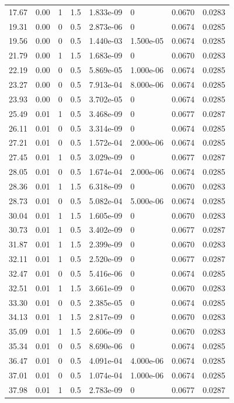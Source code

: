 \documentclass[preview]{standalone}
\begin{document}
{{\begin{tabular}{L{1.2cm}C{1.2cm} C{0.3cm}C{0.5cm} C{1.4cm}C{1.4cm} C{1.4cm}C{1.4cm}}
  17.67  &  0.00  & 1     & 1.5 &  1.833e-09  & 0  & 0.0670 &  0.0283   \\ 
  19.31  &  0.00  & 0     & 0.5 &  2.873e-06  & 0  & 0.0674 &  0.0285   \\ 
  19.56  &  0.00  & 0     & 0.5 &  1.440e-03  & 1.500e-05  & 0.0674 &  0.0285   \\ 
  21.79  &  0.00  & 1     & 1.5 &  1.683e-09  & 0  & 0.0670 &  0.0283   \\ 
  22.19  &  0.00  & 0     & 0.5 &  5.869e-05  & 1.000e-06  & 0.0674 &  0.0285   \\ 
  23.27  &  0.00  & 0     & 0.5 &  7.913e-04  & 8.000e-06  & 0.0674 &  0.0285   \\ 
  23.93  &  0.00  & 0     & 0.5 &  3.702e-05  & 0  & 0.0674 &  0.0285   \\ 
  25.49  &  0.01  & 1     & 0.5 &  3.468e-09  & 0  & 0.0677 &  0.0287   \\ 
  26.11  &  0.01  & 0     & 0.5 &  3.314e-09  & 0  & 0.0674 &  0.0285   \\ 
  27.21  &  0.01  & 0     & 0.5 &  1.572e-04  & 2.000e-06  & 0.0674 &  0.0285   \\ 
  27.45  &  0.01  & 1     & 0.5 &  3.029e-09  & 0  & 0.0677 &  0.0287   \\ 
  28.05  &  0.01  & 0     & 0.5 &  1.674e-04  & 2.000e-06  & 0.0674 &  0.0285   \\ 
  28.36  &  0.01  & 1     & 1.5 &  6.318e-09  & 0  & 0.0670 &  0.0283   \\ 
  28.73  &  0.01  & 0     & 0.5 &  5.082e-04  & 5.000e-06  & 0.0674 &  0.0285   \\ 
  30.04  &  0.01  & 1     & 1.5 &  1.605e-09  & 0  & 0.0670 &  0.0283   \\ 
  30.73  &  0.01  & 1     & 0.5 &  3.402e-09  & 0  & 0.0677 &  0.0287   \\ 
  31.87  &  0.01  & 1     & 1.5 &  2.399e-09  & 0  & 0.0670 &  0.0283   \\ 
  32.11  &  0.01  & 1     & 0.5 &  2.520e-09  & 0  & 0.0677 &  0.0287   \\ 
  32.47  &  0.01  & 0     & 0.5 &  5.416e-06  & 0  & 0.0674 &  0.0285   \\ 
  32.51  &  0.01  & 1     & 1.5 &  3.661e-09  & 0  & 0.0670 &  0.0283   \\ 
  33.30  &  0.01  & 0     & 0.5 &  2.385e-05  & 0  & 0.0674 &  0.0285   \\ 
  34.13  &  0.01  & 1     & 1.5 &  2.817e-09  & 0  & 0.0670 &  0.0283   \\ 
  35.09  &  0.01  & 1     & 1.5 &  2.606e-09  & 0  & 0.0670 &  0.0283   \\ 
  35.34  &  0.01  & 0     & 0.5 &  8.690e-06  & 0  & 0.0674 &  0.0285   \\ 
  36.47  &  0.01  & 0     & 0.5 &  4.091e-04  & 4.000e-06  & 0.0674 &  0.0285   \\ 
  37.01  &  0.01  & 0     & 0.5 &  1.074e-04  & 1.000e-06  & 0.0674 &  0.0285   \\ 
  37.98  &  0.01  & 1     & 0.5 &  2.783e-09  & 0  & 0.0677 &  0.0287   \\ 
\hline 
\end{tabular} 

}}
\end{document}
